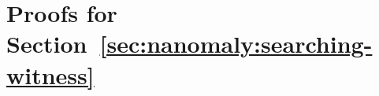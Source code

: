 \chapter{Proofs for Section~\ref{sec:nanomaly:searching-witness}}
\label{sec:nanomaly:proofs}







